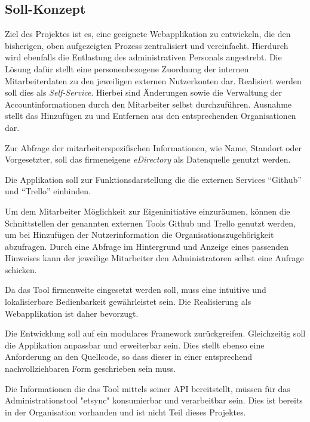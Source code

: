 \subsection{Soll-Konzept}
\label{sec:Soll-Konzept}
Ziel des Projektes ist es, eine geeignete Webapplikation zu entwickeln, die den bisherigen, oben aufgezeigten Prozess zentralisiert und vereinfacht. Hierdurch wird ebenfalls die Entlastung des administrativen Personals angestrebt.
Die Lösung dafür stellt eine personenbezogene Zuordnung der internen Mitarbeiterdaten zu den jeweiligen externen Nutzerkonten dar.
Realisiert werden soll dies als \textit{Self-Service}. Hierbei sind Änderungen sowie die Verwaltung der Accountinformationen durch den Mitarbeiter selbst durchzuführen. Ausnahme stellt das Hinzufügen zu und Entfernen aus den entsprechenden Organisationen dar.

Zur Abfrage der mitarbeiterspezifischen Informationen, wie Name, Standort oder Vorgesetzter, soll
das firmeneigene \textit{eDirectory} als Datenquelle genutzt werden.

Die Applikation soll zur Funktionsdarstellung die die externen Services “Github” und “Trello” einbinden.

Um dem Mitarbeiter Möglichkeit zur Eigeninitiative einzuräumen, können die Schnittstellen der
genannten externen Tools Github und Trello genutzt werden, um bei Hinzufügen der Nutzerinformation
die Organisationszugehörigkeit abzufragen. Durch eine Abfrage im Hintergrund und Anzeige eines
passenden Hinweises kann der jeweilige Mitarbeiter den Administratoren selbst eine Anfrage schicken.

Da das Tool firmenweite eingesetzt werden soll, muss eine intuitive und lokalisierbare Bedienbarkeit gewährleistet sein. Die Realisierung als Webapplikation ist daher bevorzugt.

Die Entwicklung soll auf ein modulares Framework zurückgreifen. Gleichzeitig soll die Applikation anpassbar und erweiterbar sein. Dies stellt ebenso eine Anforderung an den Quellcode, so dass dieser in einer entsprechend nachvollziehbaren Form geschrieben sein muss.

Die Informationen die das Tool mittels seiner API bereitstellt, müssen für das Administrationstool "etsync" konsumierbar und verarbeitbar sein. Dies ist bereits in der Organisation vorhanden und ist nicht Teil dieses Projektes.

